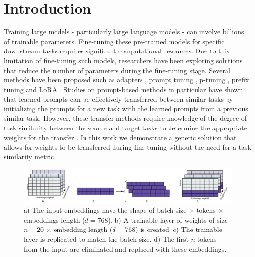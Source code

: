 \documentclass[final,6p,times,twocolumn,authoryear]{elsarticle}
\begin{document}
\begin{frontmatter}






\end{frontmatter}



\section{Introduction}
Training large models - particularly large language models - can involve billions of trainable parameters. Fine-tuning these pre-trained models for specific downstream tasks requires significant computational resources. Due to this limitation of fine-tuning such models, researchers have been exploring solutions that reduce the number of parameters during the fine-tuning stage. Several methods have been proposed such as adapters \citep{houlsby_2019}, prompt tuning \citep{lester_2021}, p-tuning \citep{liu_2021},  prefix tuning \citep{li_2021} and LoRA \citep{hu_2021}. Studies on prompt-based methods in particular have shown that learned prompts can be effectively transferred between similar tasks \citep{vu_2022} by initializing the prompts for a new task with the learned prompts from a previous similar task. However, these transfer methods require knowledge of the degree of task similarity between the source and target tasks to determine the appropriate weights for the transfer \citep{vu_2022}. In this work we demonstrate a generic solution that allows for weights to be transferred during fine tuning without the need for a task similarity metric.

\begin{figure}[t]
\includegraphics[width=\textwidth]{embeddings.jpeg}
\caption{a) The input embeddings have the shape of batch size $\times$ tokens $\times$ embeddings length ($d=768$). b) A trainable layer of weights of size $n=20$ $\times$ embedding length ($d=768$) is created. c) The trainable layer is replicated to match the batch size. d) The first $n$ tokens from the input are eliminated and replaced with these embeddings.}
\label{embeddings}
\centering
\end{figure}
\end{document}
